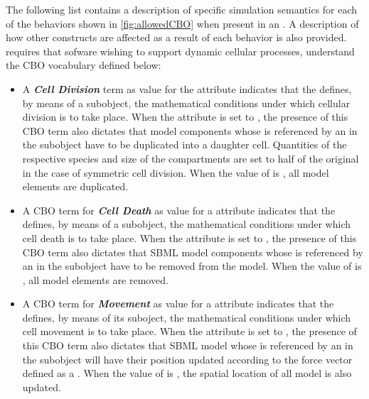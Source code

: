 The following list contains a description of specific simulation semantics for each of the behaviors shown in \ref{fig:allowedCBO} when present in an \Event. A description of how other constructs are affected as a result of each behavior is also provided. \sbmlthreedynamic requires that sofware wishing to support dynamic cellular processes, understand the CBO vocabulary defined below: 


\begin{itemize}
	\item A \textbf{\textit{Cell Division}} term as value for the  attribute indicates that the \Event defines, by means of a \Trigger subobject, the mathematical conditions under which cellular division is to take place. When the  \Event attribute is set to , the presence of this CBO term also dictates that model components whose  is referenced by an \Element in the \ListOfElements subobject have to be duplicated into a daughter cell. Quantities of the respective species and size of the compartments are set to half of the original in the case of symmetric cell division. When the value of  is , all model elements are duplicated. 
	
	\item A CBO term for \textbf{\textit{Cell Death}} as value for a  attribute indicates that the \Event defines, by means of a \Trigger subobject, the mathematical conditions under which cell death is to take place. When the  \Event attribute is set to , the presence of this CBO term also dictates that SBML model components whose  is referenced by an \Element in the \ListOfElements subobject have to be removed from the model. When the value of  is , all model elements are removed. 	
	
	\item A CBO term for \textbf{\textit{Movement}} as value for a  attribute indicates that the \Event defines, by means of its \Trigger suboject, the mathematical conditions under which cell movement is to take place. When the  \Event attribute is set to , the presence of this CBO term also dictates that SBML model \Compartments whose  is referenced by an \Element in the \ListOfElements subobject will have their position updated according to the force vector defined as a \SpatialComponent. When the value of  is , the spatial location of all model \Compartments is also updated.

\end{itemize}

